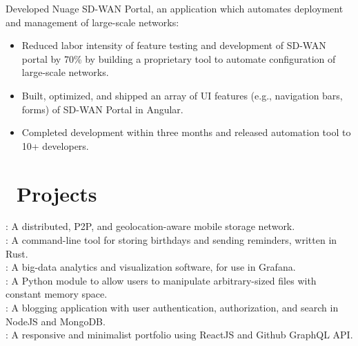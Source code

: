 \documentclass{resume}
\begin{document}
Developed Nuage SD-WAN Portal, an application which automates deployment and management of large-scale networks:
\begin{itemize}
  \item {Reduced labor intensity of feature testing and development of SD-WAN portal by 70\%
        by building a proprietary tool to automate configuration of large-scale networks.}
  \item {Built, optimized, and shipped an array of UI features (e.g., navigation bars, forms) of SD-WAN Portal in Angular.}
  \item {Completed development within three months and released automation tool to 10+ developers.}
\end{itemize}

\section{\faCodeFork\ Projects}

: A distributed, P2P, and geolocation-aware mobile storage network. \\
: A command-line tool for storing birthdays and sending reminders, written in Rust. \\
: A big-data analytics and visualization software, for use in Grafana. \\
: A Python module to allow users to manipulate arbitrary-sized files with constant memory space. \\
: A blogging application with user authentication, authorization, and search in NodeJS and MongoDB. \\
: A responsive and minimalist portfolio using ReactJS and Github GraphQL API. \\



%
%
\end{document}
